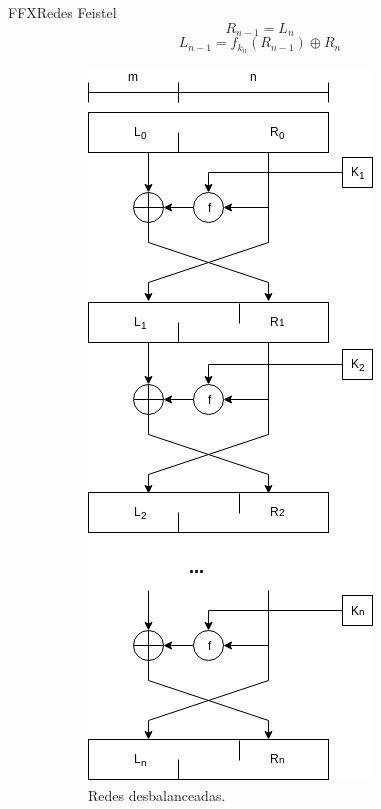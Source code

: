 \begin{frame}{FFX}{Redes Feistel}
{    $$ R_{n-1} = L_n $$
    $$ L_{n-1} = f_{k_n}(R_{n-1}) \oplus R_n $$
  }

  {
    \begin{figure}[H]
      \centering
      \begin{subfigure}{0.45\textwidth}
        \begin{center}
          \includegraphics[height=0.65\textheight]
            {../../../diagramas_comunes/redes_feistel/desbalanceadas.png}
          \caption{Redes desbalanceadas.}
        \end{center}
      \end{subfigure}
      \begin{subfigure}{0.45\textwidth}
        \begin{center}

\end{center}
\end{subfigure}
\end{figure}}
\end{frame}
